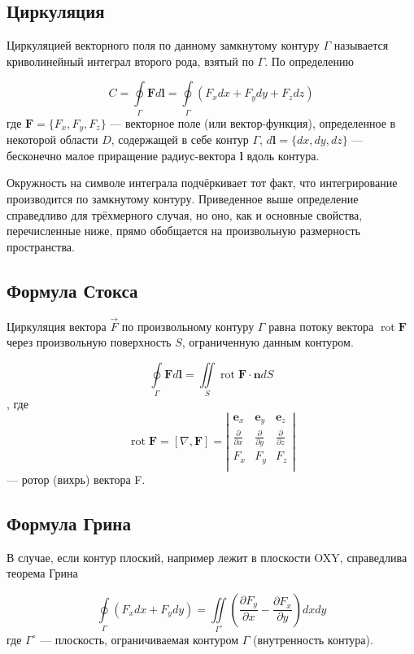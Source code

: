 \subsection{Циркуляция}
Циркуляцией векторного поля по данному замкнутому контуру $\Gamma$ называется криволинейный интеграл второго рода, взятый по $\Gamma$. По определению

$$C=\oint \limits _{\Gamma }{\mathbf {F} d\mathbf {l} }=\oint \limits _{\Gamma }{(F_{x}dx+F_{y}dy+F_{z}dz)}$$
где $\mathbf {F} =\{F_{x},F_{y},F_{z}\}$ — векторное поле (или вектор-функция), определенное в некоторой области $D$, содержащей в себе контур $\Gamma$, $d\mathbf {l} =\{dx,dy,dz\}$ — бесконечно малое приращение радиус-вектора $\mathbf  {l}$ вдоль контура. 

Окружность на символе интеграла подчёркивает тот факт, что интегрирование производится по замкнутому контуру. Приведенное выше определение справедливо для трёхмерного случая, но оно, как и основные свойства, перечисленные ниже, прямо обобщается на произвольную размерность пространства.

\subsection{Формула Стокса}Циркуляция вектора $\vec F$ по произвольному контуру $\Gamma$ равна потоку вектора $\operatorname {rot} \mathbf {F}$ через произвольную поверхность $S$, ограниченную данным контуром.

$$\oint \limits _{\Gamma }{\mathbf {F} d\mathbf {l} =\iint \limits _{S}{\operatorname {rot} }}\mathbf {F} \cdot \mathbf {n} dS$$,
где $$\operatorname {rot} \mathbf {F} =[\nabla ,\mathbf {F} ]=\left|{\begin{matrix}\mathbf {e} _{x}&\mathbf {e} _{y}&\mathbf {e} _{z}\\{\frac {\partial }{\partial x}}&{\frac {\partial }{\partial y}}&{\frac {\partial }{\partial z}}\\F_{x}&F_{y}&F_{z}\\\end{matrix}}\right|$$— ротор (вихрь) вектора F.


\subsection{Формула Грина}
В случае, если контур плоский, например лежит в плоскости OXY, справедлива теорема Грина

$$\displaystyle \oint \limits _{\Gamma }{(F_{x}dx+F_{y}dy)}=\iint \limits _{\Gamma ^{\circ }}{\left({\frac {\partial F_{y}}{\partial x}}-{\frac {\partial F_{x}}{\partial y}}\right)dxdy}$$
где $\Gamma ^{\circ }$ — плоскость, ограничиваемая контуром $\Gamma$  (внутренность контура).


